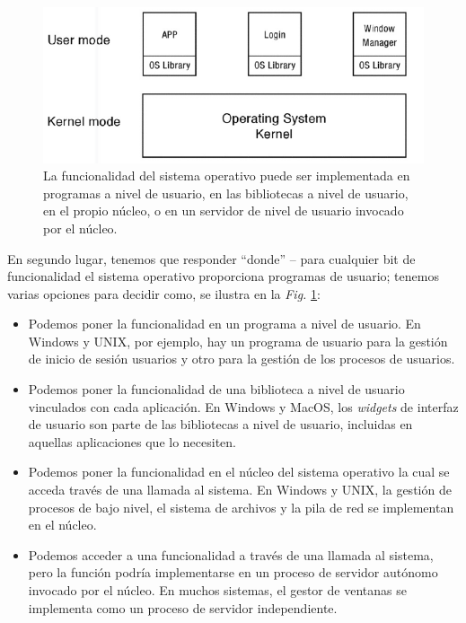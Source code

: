 \documentclass[10pt]{book}
\begin{document}
\begin{figure}[tbhp]
\centerline{\includegraphics[scale=0.45]{img/fig0301}}
\caption{La funcionalidad del sistema operativo puede ser implementada en programas a nivel de usuario, en las bibliotecas a nivel de usuario, en el propio núcleo, o en un servidor de nivel de usuario invocado por el núcleo.}
\label{fig0301}
\end{figure}

En segundo lugar, tenemos que responder ``donde'' -- para cualquier bit de funcionalidad el sistema operativo proporciona programas de usuario; tenemos varias opciones para decidir como, se ilustra en la \textit{Fig.} \ref{fig0301}:

\begin{itemize}
\item Podemos poner la funcionalidad en un programa a nivel de usuario. En Windows y UNIX, por ejemplo, hay un programa de usuario para la gestión de inicio de sesión usuarios y otro para la gestión de los procesos de usuarios.

\item Podemos poner la funcionalidad de una biblioteca a nivel de usuario vinculados con cada aplicación. En Windows y MacOS, los \textit{widgets} de interfaz de usuario son parte de las bibliotecas a nivel de usuario, incluidas en aquellas aplicaciones que lo necesiten.

\item Podemos poner la funcionalidad en el núcleo del sistema operativo la cual se acceda través de una llamada al sistema. En Windows y UNIX, la gestión de procesos de bajo nivel, el sistema de archivos y la pila de red se implementan en el núcleo.

\item Podemos acceder a una funcionalidad a través de una llamada al sistema, pero la función podría implementarse en un proceso de servidor autónomo invocado por el núcleo. En muchos sistemas, el gestor de ventanas se implementa como un proceso de servidor independiente.
\end{itemize}
\end{document}
